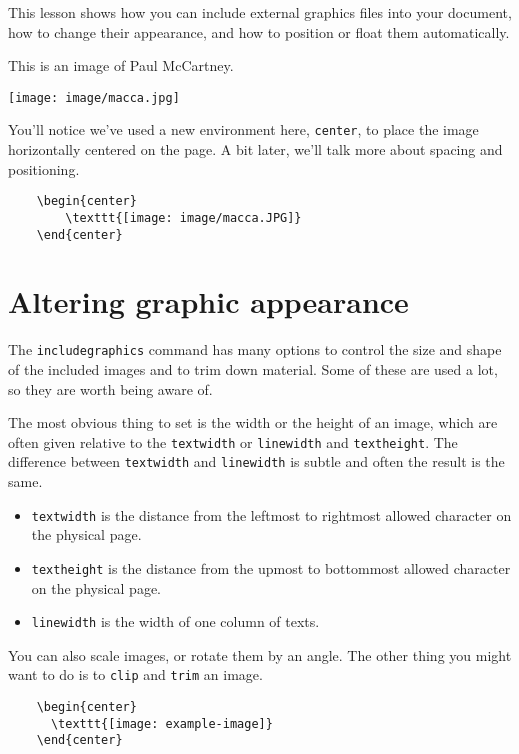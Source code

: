 \documentclass{article}
\begin{document}
This lesson shows how you can include external graphics files into your document, how to change their appearance, and how to position or float them automatically.
\vspace{0.5cm}

This is an image of Paul McCartney.

\begin{center}
    \texttt{[image: image/macca.jpg]}
\end{center}

You’ll notice we’ve used a new environment here, \texttt{center}, to place the image horizontally centered on the page. A bit later, we’ll talk more about spacing and positioning.

\begin{verbatim}
    \begin{center}
        \texttt{[image: image/macca.JPG]}
    \end{center}
\end{verbatim}

\section{Altering graphic appearance}
The \texttt{includegraphics} command has many options to control the size and shape of the included images and to trim down material. Some of these are used a lot, so they are worth being aware of.

The most obvious thing to set is the width or the height of an image, which are often given relative to the \texttt{textwidth} or \texttt{linewidth} and \texttt{textheight}. The difference between \texttt{textwidth} and \texttt{linewidth} is subtle and often the result is the same. 

\begin{itemize}
    \item \texttt{textwidth} is the distance from the leftmost to rightmost allowed character on the physical page.
    \item \texttt{textheight} is the distance from the upmost to bottommost allowed character on the physical page.
    \item \texttt{linewidth} is the width of one column of texts.
\end{itemize}

You can also scale images, or rotate them by an angle. The other thing you might want to do is to \texttt{clip} and \texttt{trim} an image.

\begin{verbatim}
    \begin{center}
      \texttt{[image: example-image]}
    \end{center}
\end{verbatim}
\end{document}
